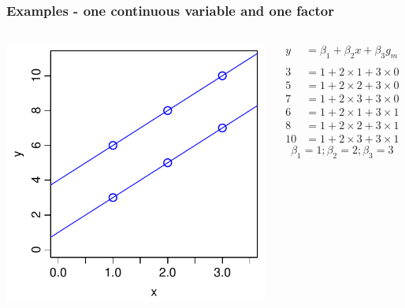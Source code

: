 \documentclass[aspectratio=43]{beamer}
\begin{document}
\frame
{\frametitle{Examples - one continuous variable and one factor}

\begin{columns}[T]

		\includegraphics[width=\textwidth]{TwoVars.pdf}
		
		\begin{align*}
		  y  &= \beta_1  + \beta_2 x + \beta_3 g_m\\
		  \\
		  3   &= 1 + 2 \times 1 + 3 \times 0\\
		  5   &= 1 + 2 \times 2 + 3 \times 0\\
		  7   &= 1 + 2 \times 3 + 3 \times 0\\
		  6   &= 1 + 2 \times 1 + 3 \times 1\\  
		  8   &= 1 + 2 \times 2 + 3 \times 1\\
		  10  &= 1 + 2 \times 3 + 3 \times 1
		\end{align*}
        \[\beta_1 = 1; \beta_2=2; \beta_3=3\]
\end{columns}
}
\end{document}
